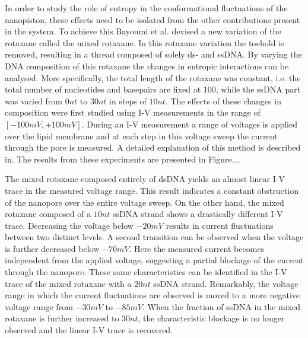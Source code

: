 
In order to study the role of entropy in the conformational fluctuations of
the nanopiston, these effects need to be isolated from the other contributions present in
the system. To achieve this Bayoumi et al. devised a new variation of the rotaxane
called the mixed rotaxane. In this rotaxane variation the toehold is removed, resulting
in a thread composed of solely ds- and ssDNA. By varying the DNA composition of this
rotaxane the changes in entropic interactions can be analysed. More specifically, the
total length of the rotaxane was constant, i.e. the total number of nucleotides and
basepairs are fixed at 100, while the ssDNA part was varied from $0nt$ to $30 nt$ in
steps of $10nt$. The effects of these changes in composition were first studied using I-V
measurements in the range of $[-100mV, +100mV]$. During an I-V measurement a range of
voltages is applied over the lipid membrane and at each step in this voltage sweep the
current through the pore is measured. A detailed explanation of this method is described
in. \cite{MAGLIA2010591} The results from these experiments are presented in Figure....

The mixed rotaxane composed entirely of dsDNA yields an almost linear I-V trace in the
measured voltage range. This result indicates a constant obstruction of the nanopore over
the entire voltage sweep. On the other hand, the mixed rotaxane composed of a $10nt$
ssDNA strand shows a drastically different I-V trace. Decreasing the voltage below
$-20mV$ results in current fluctuations between two distinct levels. A second transition
can be observed when the voltage is further decreased below $-70mV$. Here the measured
current becomes independent from the applied voltage, suggesting a partial blockage of
the current through the nanopore. These same characteristics can be identified in the I-V
trace of
the mixed rotaxane with a $20nt$ ssDNA strand. Remarkably, the voltage range
in which the current fluctuations are observed is moved to a more negative
voltage range from $-30mV$ to  $-85 mV$. When the fraction of ssDNA in the mixed rotaxane
is further increased to $30nt$, the characteristic blockage is no longer observed and the
linear I-V trace is recovered.

